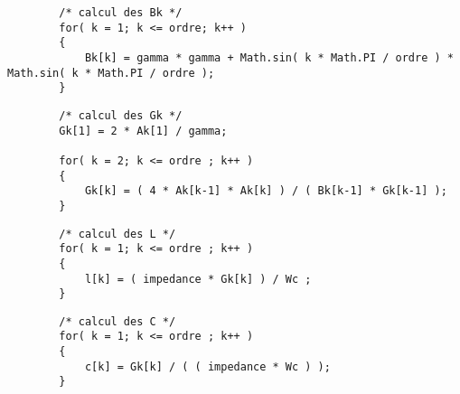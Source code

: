     \begin{lstlisting}
        /* calcul des Bk */
        for( k = 1; k <= ordre; k++ )
        {
            Bk[k] = gamma * gamma + Math.sin( k * Math.PI / ordre ) * Math.sin( k * Math.PI / ordre );
        }
    \end{lstlisting}


    \begin{lstlisting}
        /* calcul des Gk */
        Gk[1] = 2 * Ak[1] / gamma;

        for( k = 2; k <= ordre ; k++ )
        {
            Gk[k] = ( 4 * Ak[k-1] * Ak[k] ) / ( Bk[k-1] * Gk[k-1] );
        }
    \end{lstlisting}


    \begin{lstlisting}
        /* calcul des L */
        for( k = 1; k <= ordre ; k++ )
        {
            l[k] = ( impedance * Gk[k] ) / Wc ;
        }
    \end{lstlisting}


    \begin{lstlisting}
        /* calcul des C */
        for( k = 1; k <= ordre ; k++ )
        {
            c[k] = Gk[k] / ( ( impedance * Wc ) );
        }
    \end{lstlisting}
